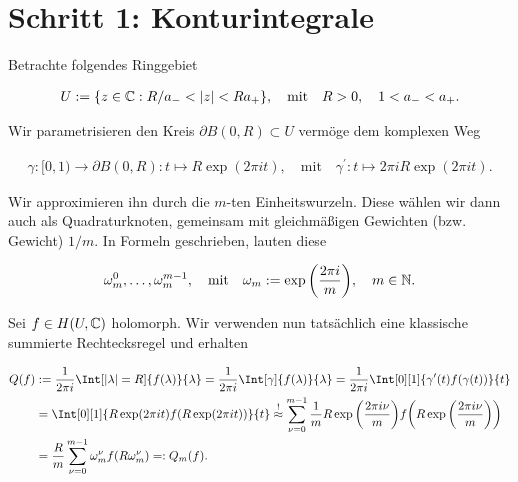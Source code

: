 \section{Schritt 1: Konturintegrale}

Betrachte folgendes Ringgebiet

\begin{align*}
    U := {\left \{ z \in \mathbb{C}: R / a_- < |z| < R a_+ \right \}},
    \quad
    \text{mit}
    \quad
    R > 0,
    \quad
    1 < a_- < a_+.
\end{align*}

Wir parametrisieren den Kreis $\partial B(0, R) \subset U$ vermöge dem komplexen Weg

\begin{align*}
    \gamma: [0, 1) \to \partial B(0, R): t \mapsto R \exp(2 \pi i t),
    \quad
    \text{mit}
    \quad
    \gamma^\prime: t \mapsto 2 \pi i R \exp(2 \pi i t).
\end{align*}

Wir approximieren ihn durch die $m$-ten Einheitswurzeln.
Diese wählen wir dann auch als Quadraturknoten, gemeinsam mit gleichmäßigen Gewichten (bzw. Gewicht) $1 / m$.
In Formeln geschrieben, lauten diese

\begin{align*}
    \omega_m^0, \dots, \omega_m^{m - 1},
    \quad
    \text{mit}
    \quad
    \omega_m := \exp {\left ( \frac{2 \pi i}{m} \right )},
    \quad
    m \in \mathbb{N}.
\end{align*}

Sei $f \in H(U, \mathbb{C})$ holomorph.
Wir verwenden nun tatsächlich eine klassische summierte Rechtecksregel und erhalten

\begin{align*}
    Q(f)
    & :=
    \frac{1}{2 \pi i}
    \Int[|\lambda| = R]
    {
        f(\lambda)
    }{\lambda}
    =
    \frac{1}{2 \pi i}
    \Int[\gamma]
    {
        f(\lambda)
    }{\lambda}
    =
    \frac{1}{2 \pi i}
    \Int[0][1]
    {
        \gamma^\prime(t)
        f(\gamma(t))
    }{t} \\
    & =
    \Int[0][1]
    {
        R
        \exp(2 \pi i t)
        f(R \exp(2 \pi i t))
    }{t}
    \stackrel{!}{\approx}
    \sum_{\nu = 0}^{m-1}
        \frac{1}{m}
        R \exp \pbraces{\frac{2 \pi i \nu}{m}}
        f
        \pbraces
        {
            R \exp \pbraces{\frac{2 \pi i \nu}{m}}
        } \\
    & =
    \frac{R}{m}
    \sum_{\nu = 0}^{m-1}
        \omega_m^\nu
        f(R \omega_m^\nu)
    =:
    Q_m(f).
\end{align*}

